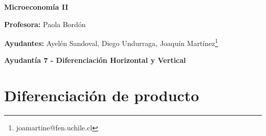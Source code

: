 \documentclass{exam}
\renewcommand{\thefootnote}{\fnsymbol{footnote}}
\begin{document}
\begin{center}

\LARGE{\textbf{Microeconomía II}}

\medskip
\normalsize \textbf{Profesora:} Paola Bordón

\normalsize \textbf{Ayudantes:} Ayelén Sandoval, Diego Undurraga, Joaquín Martínez\footnote[2]{joamartine@fen.uchile.cl}


\medskip
\large{\textbf{Ayudantía 7 - Diferenciación Horizontal y Vertical}}

\end{center}

\tableofcontents

\renewcommand{\thefootnote}{\Roman{footnote}}

\section{Diferenciación de producto}
\end{document}
